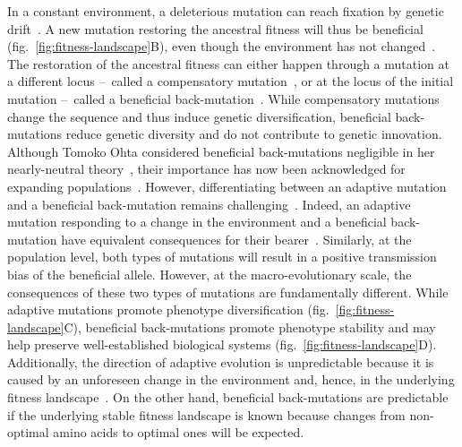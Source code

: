 \documentclass{article}
\begin{document}
    In a constant environment, a deleterious mutation can reach fixation by genetic drift~\cite{Ohta1992}.
    A new mutation restoring the ancestral fitness will thus be beneficial (fig.~\ref{fig:fitness-landscape}B), even though the environment has not changed~\cite{hartl_compensatory_1996, sella_application_2005, mustonen_fitness_2009, cvijovic_fate_2015}.
    The restoration of the ancestral fitness can either happen through a mutation at a different locus –~called a compensatory mutation~\cite{hartl_compensatory_1996, mustonen_fitness_2009}, or at the locus of the initial mutation –~called a beneficial back-mutation~\cite{piganeau_estimating_2003, charlesworth_other_2007}.
    While compensatory mutations change the sequence and thus induce genetic diversification, beneficial back-mutations reduce genetic diversity and do not contribute to genetic innovation.
    Although Tomoko Ohta considered beneficial back-mutations negligible in her nearly-neutral theory~\cite{Ohta1992}, their importance has now been acknowledged for expanding populations~\cite{charlesworth_other_2007}.
    However, differentiating between an adaptive mutation and a beneficial back-mutation remains challenging~\cite{chi_detecting_2020}.
    Indeed, an adaptive mutation responding to a change in the environment and a beneficial back-mutation have equivalent consequences for their bearer~\cite{charlesworth_other_2007}.
    Similarly, at the population level, both types of mutations will result in a positive transmission bias of the beneficial allele.
    However, at the macro-evolutionary scale, the consequences of these two types of mutations are fundamentally different.
    While adaptive mutations promote phenotype diversification (fig.~\ref{fig:fitness-landscape}C), beneficial back-mutations promote phenotype stability and may help preserve well-established biological systems (fig.~\ref{fig:fitness-landscape}D).
    Additionally, the direction of adaptive evolution is unpredictable because it is caused by an unforeseen change in the environment and, hence, in the underlying fitness landscape~\cite{bazykin_changing_2015}.
    On the other hand, beneficial back-mutations are predictable if the underlying stable fitness landscape is known because changes from non-optimal amino acids to optimal ones will be expected.

\end{document}
